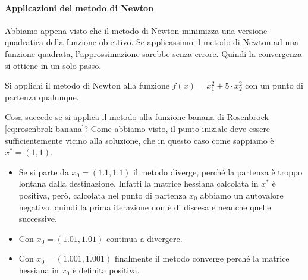 \paragraph{Applicazioni del metodo di Newton} Abbiamo appena visto che
il metodo di Newton minimizza una versione quadratica della funzione
obiettivo. Se applicassimo il metodo di Newton ad una funzione
quadrata, l'approssimazione sarebbe senza errore. Quindi la
convergenza si ottiene in un solo passo.

\begin{exercise} Si applichi il metodo di Newton alla funzione
$f(x)=x_1^2 + 5\cdot x_2^2$ con un punto di partenza qualunque.
\end{exercise}

\begin{observation} Cosa succede se si applica il metodo alla funzione
banana di Rosenbrock \ref{eq:rosenbrok-banana}? Come abbiamo visto, il
punto iniziale deve essere sufficientemente vicino alla soluzione, che
in questo caso come sappiamo \`e $x^* = (1,1)$.
\begin{itemize}
\item Se si parte da $x_0 = (1.1,1.1)$ il metodo diverge, perch\'e la
partenza \`e troppo lontana dalla destinazione. Infatti la matrice
hessiana calcolata in $x^*$ \`e positiva, però, calcolata nel punto di
partenza $x_0$ abbiamo un autovalore negativo, quindi la prima
iterazione non \`e di discesa e neanche quelle successive.
\item Con $x_0 = (1.01,1.01)$ continua a divergere.
\item Con $x_0 = (1.001,1.001)$ finalmente il metodo converge perch\'e
la matrice hessiana in $x_0$ \`e definita positiva.
\end{itemize}
\end{observation}

\outbpdocument

